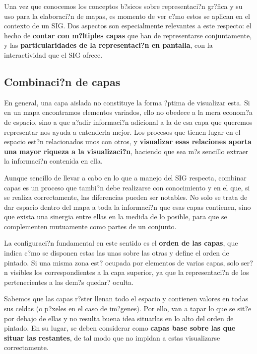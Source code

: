 Una vez que conocemos los conceptos b?sicos sobre representaci?n gr?fica y su uso para la elaboraci?n de mapas, es momento de ver c?mo estos se aplican en el contexto de un SIG. Dos aspectos son especialmente relevantes a este respecto: el hecho de \textbf{contar con m?ltiples capas} que han de representarse conjuntamente, y las \textbf{particularidades de la representaci?n en pantalla}, con la interactividad que el SIG ofrece.


\subsection{Combinaci?n de capas}

En general, una capa aislada no constituye la forma ?ptima de visualizar esta. Si en un mapa encontramos elementos variados, ello no obedece a la mera econom?a de espacio, sino a que a?adir informaci?n adicional a la de esa capa que queremos representar nos ayuda a entenderla mejor. Los procesos que tienen lugar en el espacio est?n relacionados unos con otros, y \textbf{visualizar esas relaciones aporta una mayor riqueza a la visualizaci?n}, haciendo que sea m?s sencillo extraer la informaci?n contenida en ella. 

Aunque sencillo de llevar a cabo en lo que a manejo del SIG respecta, combinar capas es un proceso que tambi?n debe realizarse con conocimiento y en el que, si se realiza correctamente, las diferencias pueden ser notables. No solo se trata de dar espacio dentro del mapa a toda la informaci?n que esas capas contienen, sino que exista una sinergia entre ellas en la medida de lo posible, para que se complementen mutuamente como partes de un conjunto. 


La configuraci?n fundamental en este sentido es el \textbf{orden de las capas}, que indica c?mo se disponen estas las unas sobre las otras y define el orden de pintado. Si una misma zona est? ocupada por elementos de varias capas, solo ser?n visibles los correspondientes a la capa superior, ya que la representaci?n de los pertenecientes a las dem?s quedar? oculta. 

Sabemos que las capas r?ster llenan todo el espacio y contienen valores en todas sus celdas (o p?xeles en el caso de im?genes). Por ello, van a tapar lo que se sit?e por debajo de ellas y no resulta buena idea situarlas en lo alto del orden de pintado. En su lugar, se deben considerar como \textbf{capas base sobre las que situar las restantes}, de tal modo que no impidan a estas visualizarse correctamente.

